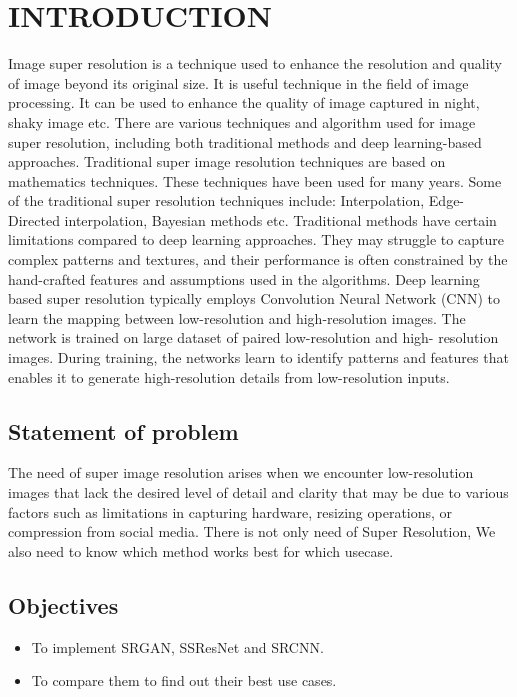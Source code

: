 \newpage
{}
\section{INTRODUCTION}
Image super resolution is a technique used to enhance the resolution and quality of
image beyond its original size. It is useful technique in the field of image processing. It
can be used to enhance the quality of image captured in night, shaky image etc. There
are various techniques and algorithm used for image super resolution, including both
traditional methods and deep learning-based approaches. Traditional super image
resolution techniques are based on mathematics techniques. These techniques have
been used for many years. Some of the traditional super resolution techniques include:
Interpolation, Edge-Directed interpolation, Bayesian methods etc. Traditional methods
have certain limitations compared to deep learning approaches. They may struggle to
capture complex patterns and textures, and their performance is often constrained by
the hand-crafted features and assumptions used in the algorithms.
Deep learning based super resolution typically employs Convolution Neural
Network (CNN) to learn the mapping between low-resolution and high-resolution
images. The network is trained on large dataset of paired low-resolution and high-
resolution images. During training, the networks learn to identify patterns and features
that enables it to generate high-resolution details from low-resolution inputs.


\subsection{Statement of problem}
The need of super image resolution arises when we encounter low-resolution images
that lack the desired level of detail and clarity that may be due to various factors such as limitations in capturing hardware, resizing
operations, or compression from social media. There is not only need of Super Resolution, We also need to know which method works best for which usecase.

\subsection{Objectives} 
\begin{itemize}
    \item To implement SRGAN, SSResNet and SRCNN.
    \item To compare them to find out their best use cases.
\end{itemize}

